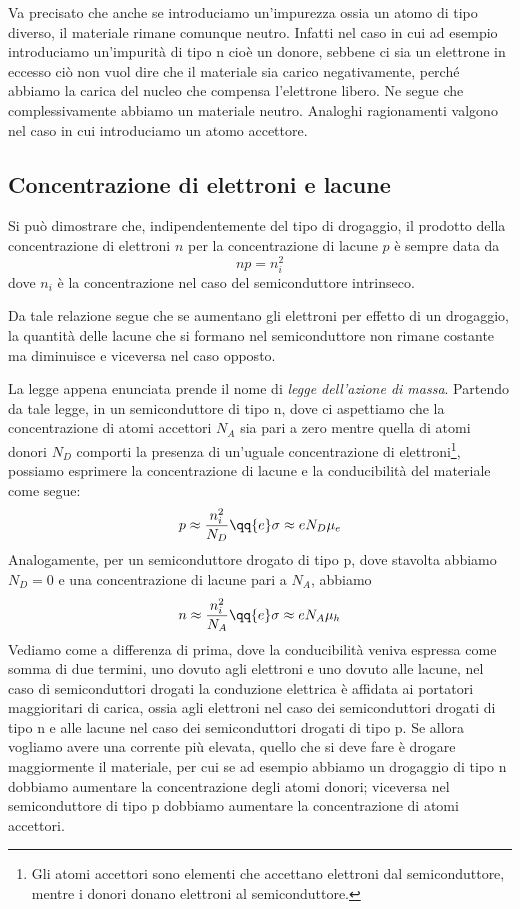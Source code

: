 Va precisato che anche se introduciamo un'impurezza ossia un atomo di tipo diverso, il materiale rimane comunque neutro. Infatti nel caso in cui ad esempio introduciamo un'impurità di tipo n cioè un donore, sebbene ci sia un elettrone in eccesso ciò non vuol dire che il materiale sia carico negativamente, perché abbiamo la carica del nucleo che compensa l'elettrone libero. Ne segue che complessivamente abbiamo un materiale neutro. Analoghi ragionamenti valgono nel caso in cui introduciamo un atomo accettore.

\subsection{Concentrazione di elettroni e lacune}
Si può dimostrare che, indipendentemente del tipo di drogaggio, il prodotto della concentrazione di elettroni $n$ per la concentrazione di lacune $p$ è sempre data da
\begin{equation*}
   np=n_i^2
\end{equation*}
dove $n_i$ è la concentrazione nel caso del semiconduttore intrinseco.

Da tale relazione segue che se aumentano gli elettroni per effetto di un drogaggio, la quantità delle lacune che si formano nel semiconduttore non rimane costante ma diminuisce e viceversa nel caso opposto. 

La legge appena enunciata prende il nome di \textit{legge dell'azione di massa}. Partendo da tale legge, in un semiconduttore di tipo n, dove ci aspettiamo che la concentrazione di atomi accettori $N_A$ sia pari a zero mentre quella di atomi donori $N_D$ comporti la presenza di un'uguale concentrazione di elettroni\footnote{Gli atomi accettori sono elementi che accettano elettroni dal semiconduttore, mentre i donori donano elettroni al semiconduttore.}, possiamo esprimere la concentrazione di lacune e la conducibilità del materiale come segue:
\begin{equation*}
   p \approx \frac{n_i^2}{N_D}
   \qq{e}
   \sigma \approx e N_D \mu_e
\end{equation*}
Analogamente, per un semiconduttore drogato di tipo p, dove stavolta abbiamo $N_D=0$ e una concentrazione di lacune pari a $N_A$, abbiamo 
\begin{equation*}
   n \approx \frac{n_i^2}{N_A}
   \qq{e}
   \sigma \approx e N_A \mu_h
\end{equation*}
Vediamo come a differenza di prima, dove la conducibilità veniva espressa come somma di due termini, uno dovuto agli elettroni e uno dovuto alle lacune, nel caso di semiconduttori drogati la conduzione elettrica è affidata ai portatori maggioritari di carica, ossia agli elettroni nel caso dei semiconduttori drogati di tipo n e alle lacune nel caso dei semiconduttori drogati di tipo p. Se allora vogliamo avere una corrente più elevata, quello che si deve fare è drogare maggiormente il materiale, per cui se ad esempio abbiamo un drogaggio di tipo n dobbiamo aumentare la concentrazione degli atomi donori; viceversa nel semiconduttore di tipo p dobbiamo aumentare la concentrazione di atomi accettori.


